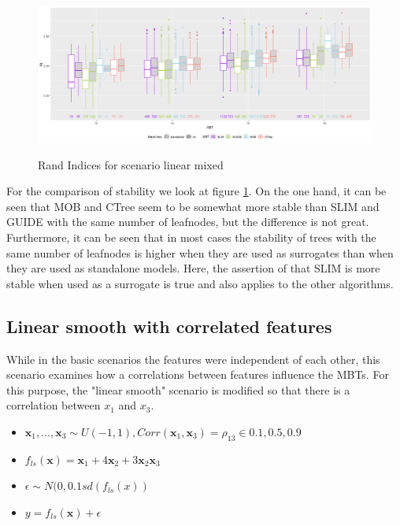 \begin{figure}[!htb]
\caption{Rand Indices for scenario linear mixed}
    \includegraphics[width=16cm]{Figures/simulations/batchtools/basic_scenarios/linear_mixed/lm_1000_standalone_lm_sta.png}
    \label{fig:lm_1000_standalone_lm_sta}
\end{figure}

For the comparison of stability we look at figure \ref{fig:lm_1000_standalone_lm_sta}. On the one hand, it can be seen that MOB and CTree seem to be somewhat more stable than SLIM and GUIDE with the same number of leafnodes, but the difference is not great. Furthermore, it can be seen that in most cases the stability of trees with the same number of leafnodes is higher when they are used as surrogates than when they are used as standalone models. Here, the assertion of \citep{Hu.2020} that SLIM is more stable when used as a surrogate is true and also applies to the other algorithms.


\newpage
\subsection{Linear smooth with correlated features}
While in the basic scenarios the features were independent of each other, this scenario examines how a correlations between features influence the MBTs. For this purpose, the "linear smooth" scenario is modified so that there is a correlation between $x_1$ and $x_3$.
\begin{itemize}
    \item $\textbf{x}_1,..., \textbf{x}_3 \sim U(-1,1), Corr(\textbf{x}_1, \textbf{x}_3) = \rho_{13} \in {0.1, 0.5, 0.9}$
    \item $ f_{ls}(\textbf{x}) = \textbf{x}_1 + 4   \textbf{x}_2 + 3   \textbf{x}_2   \textbf{x}_3 $
    \item $\epsilon \sim N(0, 0.1 sd(f_{ls}(x))$
    \item $y = f_{ls}(\textbf{x}) + \epsilon$
\end{itemize}

